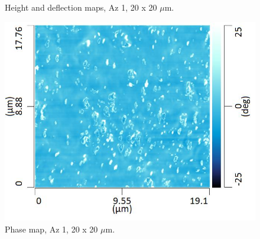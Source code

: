 \begin{figure}[H]
\begin{minipage}{.45\textwidth}
\end{minipage}
\caption[Height and deflection maps, Az 1]{Height and deflection maps, Az 1, 20 x 20 $\mu$m.}
\label{fig:afm_az1_height_def_6}
\end{figure}

\begin{figure}[H]
\centering
  \includegraphics[width=.45\textwidth]{Az1_tapping_mode_240521_phase_5}
\caption[Phase map, Az 1]{Phase map, Az 1, 20 x 20 $\mu$m.}
\label{fig:afm_az1_phase_6}
\end{figure}



